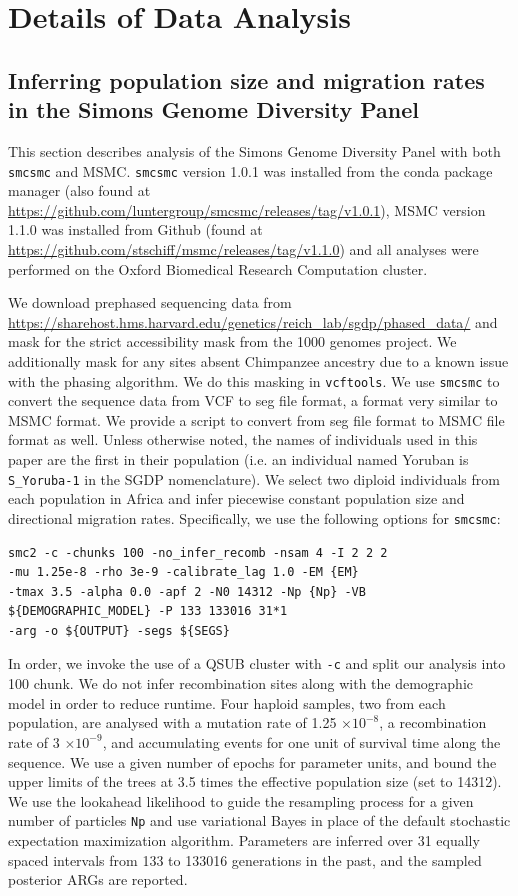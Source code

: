 \documentclass{article}
\begin{document}
\section{Details of Data Analysis}

\subsection{Inferring population size and migration rates in the Simons Genome Diversity Panel}

This section describes analysis of the Simons Genome Diversity Panel with both {\tt smcsmc} and MSMC. {\tt smcsmc} version 1.0.1 was installed from the conda package manager (also found at \url{https://github.com/luntergroup/smcsmc/releases/tag/v1.0.1}), MSMC version 1.1.0 was installed from Github (found at \url{https://github.com/stschiff/msmc/releases/tag/v1.1.0}) and all analyses were performed on the Oxford Biomedical Research Computation cluster.

We download prephased sequencing data from \url{https://sharehost.hms.harvard.edu/genetics/reich_lab/sgdp/phased_data/} and mask for the strict accessibility mask from the 1000 genomes project. We additionally mask for any sites absent Chimpanzee ancestry due to a known issue with the phasing algorithm. We do this masking in {\tt vcftools}. We use {\tt smcsmc} to convert the sequence data from VCF to seg file format, a format very similar to MSMC format. We provide a script to convert from seg file format to MSMC file format as well. Unless otherwise noted, the names of individuals used in this paper are the first in their population (i.e. an individual named Yoruban is {\tt S\_Yoruba-1} in the SGDP nomenclature). We select two diploid individuals from each population in Africa  and infer piecewise constant population size and directional migration rates. Specifically, we use the following options for {\tt smcsmc}:

\begin{verbatim}
smc2 -c -chunks 100 -no_infer_recomb -nsam 4 -I 2 2 2
-mu 1.25e-8 -rho 3e-9 -calibrate_lag 1.0 -EM {EM} 
-tmax 3.5 -alpha 0.0 -apf 2 -N0 14312 -Np {Np} -VB 
${DEMOGRAPHIC_MODEL} -P 133 133016 31*1 
-arg -o ${OUTPUT} -segs ${SEGS}
\end{verbatim}

In order, we invoke the use of a QSUB cluster with {\tt -c} and split our analysis into 100 chunk. We do not infer recombination sites along with the demographic model in order to reduce runtime. Four haploid samples, two from each population, are analysed with a mutation rate of 1.25 $\times 10^{-8}$, a recombination rate of 3 $\times 10^{-9}$, and accumulating events for one unit of survival time along the sequence. We use a given number of epochs for parameter units, and bound the upper limits of the trees at 3.5 times the effective population size (set to 14312). We use the lookahead likelihood to guide the resampling process for a given number of particles {\tt Np} and use variational Bayes in place of the default stochastic expectation maximization algorithm. Parameters are inferred over 31 equally spaced intervals from 133 to 133016 generations in the past, and the sampled posterior ARGs are reported. 
\end{document}
